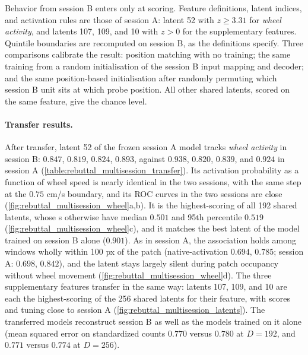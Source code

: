 Behavior from session B enters only at scoring. Feature definitions, latent indices, and activation rules are those of session A: latent 52 with $z\geq3.31$ for \textit{wheel activity}, and latents 107, 109, and 10 with $z>0$ for the supplementary features. Quintile boundaries are recomputed on session B, as the definitions specify. Three comparisons calibrate the result: position matching with no training; the same training from a random initialisation of the session B input mapping and decoder; and the same position-based initialisation after randomly permuting which session B unit sits at which probe position. All other shared latents, scored on the same feature, give the chance level.

\paragraph{Transfer results.}
After transfer, latent 52 of the frozen session A model tracks \textit{wheel activity} in session B:  $0.847$,  $0.819$,  $0.824$,  $0.893$, against $0.938$, $0.820$, $0.839$, and $0.924$ in session A (\autoref{table:rebuttal_multisession_transfer}). Its activation probability as a function of wheel speed is nearly identical in the two sessions, with the same step at the $0.75$ cm/s boundary, and its ROC curves in the two sessions are close (\autoref{fig:rebuttal_multisession_wheel}a,b). It is the highest-scoring of all 192 shared latents, whose s otherwise have median $0.501$ and 95th percentile $0.519$ (\autoref{fig:rebuttal_multisession_wheel}c), and it matches the best latent of the model trained on session B alone ($0.901$). As in session A, the association holds among windows wholly within 100 px of the patch (native-activation  $0.694$,  $0.785$; session A: $0.698$, $0.842$), and the latent stays largely silent during patch occupancy without wheel movement (\autoref{fig:rebuttal_multisession_wheel}d). The three supplementary features transfer in the same way: latents 107, 109, and 10 are each the highest-scoring of the 256 shared latents for their feature, with scores and tuning close to session A (\autoref{fig:rebuttal_multisession_latents}). The transferred models reconstruct session B as well as the models trained on it alone (mean squared error on standardized counts $0.770$ versus $0.780$ at $D=192$, and $0.771$ versus $0.774$ at $D=256$).

